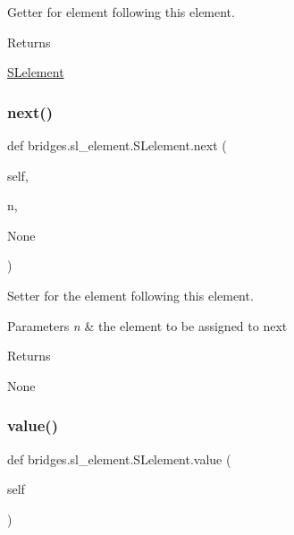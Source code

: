 Getter for element following this element. 

\begin{DoxyReturn}{Returns}


\hyperlink{classbridges_1_1sl__element_1_1_s_lelement}{S\+Lelement} 
\end{DoxyReturn}
\mbox{\label{classbridges_1_1sl__element_1_1_s_lelement_af7cdff0e4a93e1fbbcb7f92741fe4c7b}} 
\subsubsection{\texorpdfstring{next()}{next()}\hspace{0.1cm}{\footnotesize\ttfamily [2/2]}}
{\footnotesize\ttfamily def bridges.\+sl\+\_\+element.\+S\+Lelement.\+next (\begin{DoxyParamCaption}\item[{}]{self,  }\item[{}]{n,  }\item[{}]{None }\end{DoxyParamCaption})}



Setter for the element following this element. 


\begin{DoxyParams}{Parameters}
{\em n} & the element to be assigned to next \\
\hline
\end{DoxyParams}
\begin{DoxyReturn}{Returns}


None 
\end{DoxyReturn}
\mbox{\label{classbridges_1_1sl__element_1_1_s_lelement_a64ede02c56a4efaaa4c64a245bd01dd0}} 
\subsubsection{\texorpdfstring{value()}{value()}\hspace{0.1cm}{\footnotesize\ttfamily [1/2]}}
{\footnotesize\ttfamily def bridges.\+sl\+\_\+element.\+S\+Lelement.\+value (\begin{DoxyParamCaption}\item[{}]{self }\end{DoxyParamCaption})}



